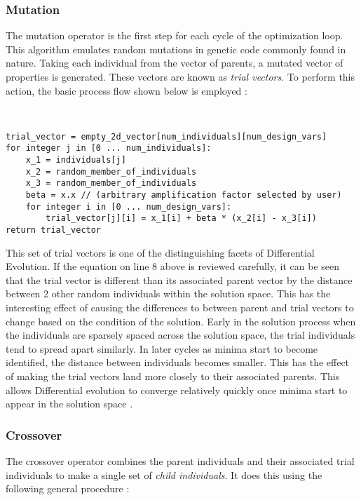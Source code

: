 \subsubsection{Mutation}
The mutation operator is the first step for each cycle of the optimization loop. This algorithm emulates random mutations in genetic code commonly found in nature. Taking each individual from the vector of parents, a mutated vector of properties is generated. These vectors are known as \emph{trial vectors}. To perform this action, the basic process flow shown below is employed \cite{diff-evol}:

\
\begin{lstlisting}[caption=Pseudo-code for the Mutation Operator \cite{diff-evol},captionpos=b]
trial_vector = empty_2d_vector[num_individuals][num_design_vars]
for integer j in [0 ... num_individuals]:
    x_1 = individuals[j]
    x_2 = random_member_of_individuals
    x_3 = random_member_of_individuals
    beta = x.x // (arbitrary amplification factor selected by user)
    for integer i in [0 ... num_design_vars]:
	    trial_vector[j][i] = x_1[i] + beta * (x_2[i] - x_3[i])
return trial_vector
\end{lstlisting}

This set of trial vectors is one of the distinguishing facets of Differential Evolution. If the equation on line 8 above is reviewed carefully, it can be seen that the trial vector is different than its associated parent vector by the distance between 2 other random individuals within the solution space. This has the interesting effect of causing the differences to between parent and trial vectors to change based on the condition of the solution. Early in the solution process when the individuals are sparsely spaced across the solution space, the trial individuals tend to spread apart similarly. In later cycles as minima start to become identified, the distance between individuals becomes smaller. This has the effect of making the trial vectors land more closely to their associated parents. This allows Differential evolution to converge relatively quickly once minima start to appear in the solution space \cite{diff-evol}.

\subsubsection{Crossover}
The crossover operator combines the parent individuals and their associated trial individuals to make a single set of \emph{child individuals}. It does this using the following general procedure \cite{diff-evol}:

